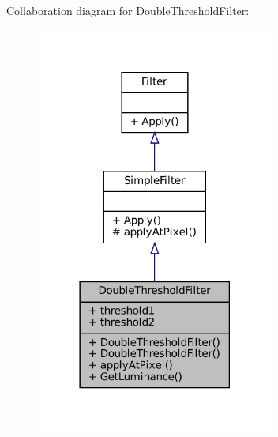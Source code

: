 Collaboration diagram for Double\+Threshold\+Filter\+:
\nopagebreak
\begin{figure}[H]
\begin{center}
\leavevmode
\includegraphics[width=222pt]{classDoubleThresholdFilter__coll__graph}
\end{center}
\end{figure}
